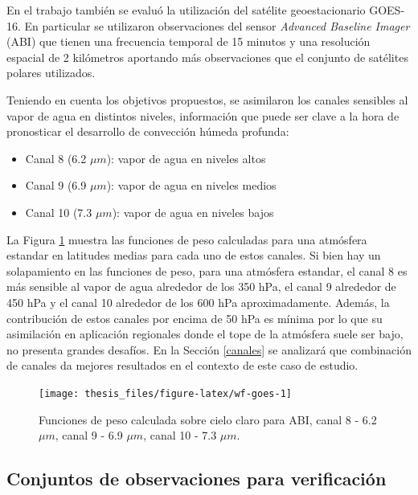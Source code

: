 \documentclass[12pt,oneside,a4paper]{reedthesis}
\providecommand{\tightlist}{%
  \setlength{\itemsep}{0pt}\setlength{\parskip}{0pt}}
\begin{document}
En el trabajo también se evaluó la utilización del satélite geoestacionario GOES-16. En particular se utilizaron observaciones del sensor \emph{Advanced Baseline Imager} (ABI) que tienen una frecuencia temporal de 15 minutos y una resolución espacial de 2 kilómetros aportando más observaciones que el conjunto de satélites polares utilizados.

Teniendo en cuenta los objetivos propuestos, se asimilaron los canales sensibles al vapor de agua en distintos niveles, información que puede ser clave a la hora de pronosticar el desarrollo de convección húmeda profunda:
\begin{itemize}
\tightlist
\item
  Canal 8 (6.2 \(\mu m\)): vapor de agua en niveles altos
\item
  Canal 9 (6.9 \(\mu m\)): vapor de agua en niveles medios
\item
  Canal 10 (7.3 \(\mu m\)): vapor de agua en niveles bajos
\end{itemize}
La Figura \ref{fig:wf-goes} muestra las funciones de peso calculadas para una atmósfera estandar en latitudes medias para cada uno de estos canales. Si bien hay un solapamiento en las funciones de peso, para una atmósfera estandar, el canal 8 es más sensible al vapor de agua alrededor de los 350 hPa, el canal 9 alrededor de 450 hPa y el canal 10 alrededor de los 600 hPa aproximadamente. Además, la contribución de estos canales por encima de 50 hPa es mínima por lo que su asimilación en aplicación regionales donde el tope de la atmósfera suele ser bajo, no presenta grandes desafíos. En la Sección \ref{canales} se analizará que combinación de canales da mejores resultados en el contexto de este caso de estudio.


\begin{figure}

{\centering \texttt{[image: thesis\_files/figure-latex/wf-goes-1]} 

}

\caption{Funciones de peso calculada sobre cielo claro para ABI, canal 8 - 6.2 \(\mu m\), canal 9 - 6.9 \(\mu m\), canal 10 - 7.3 \(\mu m\).}\label{fig:wf-goes}
\end{figure}
\hypertarget{conjuntos-de-observaciones-para-verificaciuxf3n}{%
\subsection{Conjuntos de observaciones para verificación}\label{conjuntos-de-observaciones-para-verificaciuxf3n}}
\end{document}

